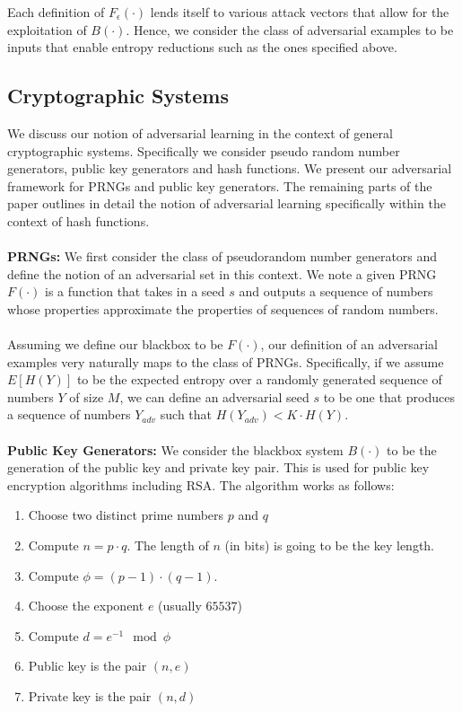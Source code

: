 \documentclass[letterpaper,twocolumn,10pt]{article}
\begin{document}
Each definition of $F_{\epsilon}(\cdot)$ lends itself to various attack vectors that allow for the exploitation of $B(\cdot)$. Hence, we consider the class of adversarial examples to be inputs that enable entropy reductions such as the ones specified above. 

\subsection{Cryptographic Systems}
We discuss our notion of adversarial learning in the context of general cryptographic systems. Specifically we consider pseudo random number generators, public key generators and hash functions. We present our adversarial framework for PRNGs and public key generators. The remaining parts of the paper outlines in detail the notion of adversarial learning specifically within the context of hash functions. 
\\
\\
\textbf{PRNGs:} We first consider the class of pseudorandom number generators and define the notion of an adversarial set in this context. We note a given PRNG $F(\cdot)$ is a function that takes in a seed $s$ and outputs a sequence of numbers whose properties approximate the properties of sequences of random numbers.
\\
\\
Assuming we define our blackbox to be $F(\cdot)$, our definition of an adversarial examples very naturally maps to the class of PRNGs. Specifically, if we assume $E[H(Y)]$ to be the expected entropy over a randomly generated sequence of numbers $Y$ of size $M$, we can define an adversarial seed $s$ to be one that produces a sequence of numbers $Y_{adv}$ such that $H(Y_{adv}) < K \cdot H(Y)$. 
\\
\\
\textbf{Public Key Generators:} We consider the blackbox system $B(\cdot)$ to be the generation of the public key and private key pair. This is used for public key encryption algorithms including RSA. The algorithm works as follows:

\begin{enumerate}
\item Choose two distinct prime numbers $p$ and $q$
\item Compute $n = p \cdot q$. The length of $n$ (in bits) is going to be the key length.
\item Compute $ \phi = (p-1) \cdot (q-1)$.
\item Choose the exponent $e$ (usually $65537$)
\item Compute $d = e^{-1} \mod \phi$
\item Public key is the pair $(n, e)$
\item Private key is the pair $(n, d)$
\end{enumerate}
\end{document}
